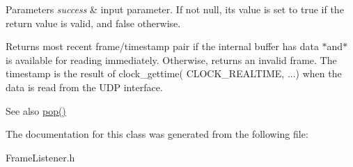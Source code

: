 \begin{DoxyParams}{\-Parameters}
{\em success} & input parameter. \-If not null, its value is set to true if the return value is valid, and false otherwise. \\
\hline
\end{DoxyParams}
\begin{DoxyReturn}{\-Returns}
most recent frame/timestamp pair if the internal buffer has data $\ast$and$\ast$ is available for reading immediately. \-Otherwise, returns an invalid frame. \-The timestamp is the result of {\ttfamily clock\-\_\-gettime}( {\ttfamily \-C\-L\-O\-C\-K\-\_\-\-R\-E\-A\-L\-T\-I\-M\-E}, ...) when the data is read from the \-U\-D\-P interface.
\end{DoxyReturn}
\begin{DoxySeeAlso}{\-See also}
\hyperlink{classFrameListener_a44a4272610cf1661ea17c4c88b866998}{pop()} 
\end{DoxySeeAlso}


\-The documentation for this class was generated from the following file\-:\begin{DoxyCompactItemize}
\item 
\-Frame\-Listener.\-h\end{DoxyCompactItemize}
